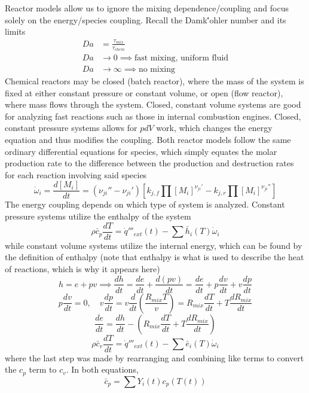 \documentclass[11pt]{article}
\begin{document}
Reactor models allow us to ignore the mixing dependence/coupling and focus solely on the energy/species coupling. Recall the Damk{\''o}hler number and its limits
\begin{align*}
Da &= \frac{\tau_{mix}}{\tau_{chem}}\\
Da&\to0\implies\textrm{fast mixing, uniform fluid}\\
Da&\to\infty\implies\textrm{no mixing}
\end{align*}
Chemical reactors may be closed (batch reactor), where the mass of the system is fixed at either constant pressure or constant volume, or open (flow reactor), where mass flows through the system. Closed, constant volume systems are good for analyzing fast reactions such as those in internal combustion engines. Closed, constant pressure systems allows for $pdV$ work, which changes the energy equation and thus modifies the coupling. Both reactor models follow the same ordinary differential equations for species, which simply equates the molar production rate to the difference between the production and destruction rates for each reaction involving said species
$$\dot\omega_i=\frac{d[M_i]}{dt} = (\nu_{ji}''-\nu_{ji}')\left[k_{j,f}\prod[M_i]^{\nu_{ji}'}-k_{j,r}\prod[M_i]^{\nu_{ji}''}\right]$$
The energy coupling depends on which type of system is analyzed. Constant pressure systems utilize the enthalpy of the system
$$\rho\bar c_p\frac{dT}{dt} = \dot q'''_{ext}(t) - \sum\bar h_i(T)\dot\omega_i$$
while constant volume systems utilize the internal energy, which can be found by the definition of enthalpy (note that enthalpy is what is used to describe the heat of reactions, which is why it appears here)
$$h = e + pv \implies \frac{dh}{dt} = \frac{de}{dt} + \frac{d(pv)}{dt} = \frac{de}{dt} + p\frac{dv}{dt} + v\frac{dp}{dt}$$
$$p\frac{dv}{dt} = 0,\quad v\frac{dp}{dt} = v\frac{d}{dt}\left(\frac{R_{mix}T}{v}\right)=R_{mix}\frac{dT}{dt} + T\frac{dR_{mix}}{dt}$$
$$\frac{de}{dt} = \frac{dh}{dt} - \left(R_{mix}\frac{dT}{dt} + T\frac{dR_{mix}}{dt}\right)$$
$$\rho\bar c_v\frac{dT}{dt} = \dot q'''_{ext}(t) - \sum\bar e_i(T)\dot\omega_i$$
where the last step was made by rearranging and combining like terms to convert the $c_p$ term to $c_v$. In both equations,
$$\bar c_p = \sum Y_i(t)c_p(T(t))$$
\end{document}

